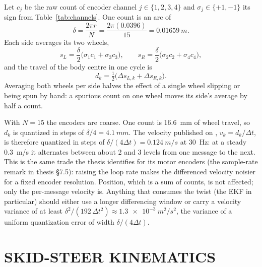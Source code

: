 Let $c_j$ be the raw count of encoder channel $j\in\{1,2,3,4\}$ and
$\sigma_j\in\{+1,-1\}$ its sign from Table~\ref{tab:channels}. One count is an
arc of
\begin{equation}\label{eq:mpc}
\delta = \frac{2\pi r}{N} = \frac{2\pi(0.0396)}{15} = \SI{0.01659}{m}.
\end{equation}
Each side averages its two wheels,
\begin{equation}
s_L = \frac{\delta}{2}\bigl(\sigma_1c_1+\sigma_3c_3\bigr),\qquad
s_R = \frac{\delta}{2}\bigl(\sigma_2c_2+\sigma_4c_4\bigr),
\end{equation}
and the travel of the body centre in one cycle is
\begin{equation}\label{eq:dcentre}
d_k = \tfrac12\bigl(\Delta s_{L,k}+\Delta s_{R,k}\bigr).
\end{equation}
Averaging both wheels per side halves the effect of a single wheel slipping
or being spun by hand: a spurious count on one wheel moves its side's average
by half a count.

\begin{remark}[Quantization]\label{rem:quant}
With $N=15$ the encoders are coarse. One count is \SI{16.6}{mm} of wheel
travel, so $d_k$ is quantized in steps of $\delta/4=\SI{4.1}{mm}$. The
velocity published on , $v_k=d_k/\Delta t$, is therefore
quantized in steps of $\delta/(4\Delta t)=\SI{0.124}{m/s}$ at \SI{30}{Hz}: at
a steady \SI{0.3}{m/s} it alternates between about 2 and 3 levels from one
message to the next. This is the same trade the thesis identifies for its
motor encoders (the sample-rate remark in thesis \S7.5): raising the loop rate makes the
differenced velocity noisier for a fixed encoder resolution. Position, which
is a sum of counts, is not affected; only the per-message velocity is.
Anything that consumes the twist (the EKF in particular) should either use a
longer differencing window or carry a velocity variance of at least
$\delta^2/(192\,\Delta t^2)\approx\SI{1.3e-3}{m^2/s^2}$, the variance of a
uniform quantization error of width $\delta/(4\Delta t)$.
\end{remark}

\section{SKID-STEER KINEMATICS}
\label{sec:skid}

